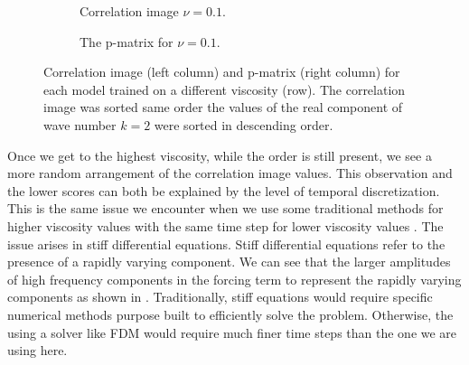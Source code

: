 \documentclass[preprint,12pt,times,authoryear]{elsarticle}
\begin{document}
\begin{figure}[H]
\begin{subfigure}{0.49\linewidth}
\begin{adjustbox}{width=\linewidth}
    \end{adjustbox}
    \caption{Correlation image \(\nu=0.1\).}\label{fig:sc2_ci_0.1}
  \end{subfigure}
  \begin{subfigure}{0.49\linewidth}
    \begin{adjustbox}{width=\linewidth}
      
    \end{adjustbox}
    \caption{The p-matrix for \(\nu=0.1\).}\label{fig:sc2_pm_0.1}
  \end{subfigure}
  \caption{Correlation image (left column) and p-matrix (right column) for each model trained on a different viscosity (row). The correlation image was sorted same order the values of the real component of wave number \(k=2\) were sorted in descending order.}\label{fig:scenario_2_interpretation}
\end{figure}

Once we get to the highest viscosity, while the order is still present, we see a more random arrangement of the correlation image values. This observation and the lower scores can both be explained by the level of temporal discretization. This is the same issue we encounter when we use some traditional methods for higher viscosity values with the same time step for lower viscosity values \citep{kassamFourthOrderTimeSteppingStiff2005,seydaogluNumericalSolutionBurgers2016}. The issue arises in stiff differential equations. Stiff differential equations refer to the presence of a rapidly varying component. We can see that the larger amplitudes of high frequency components in the forcing term to represent the rapidly varying components as shown in . Traditionally, stiff equations would require specific numerical methods purpose built to efficiently solve the problem. Otherwise, the using a solver like FDM would require much finer time steps than the one we are using here.%
\end{document}
